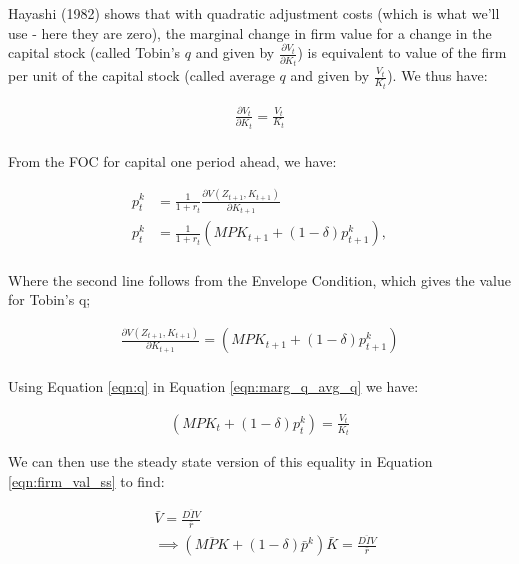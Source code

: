 \documentclass[letterpaper,12pt]{article}
\theoremstyle{definition}
\begin{document}
Hayashi (1982) shows that with quadratic adjustment costs (which is what we'll use - here they are zero), the marginal change in firm value for a change in the capital stock (called Tobin's $q$ and given by $\frac{\partial V_{t}}{\partial K_{t}}$) is equivalent to value of the firm per unit of the capital stock (called average $q$ and given by $\frac{V_{t}}{K_{t}}$).  We thus have:

\begin{equation}
\begin{split}
\label{eqn:marg_q_avg_q}
\frac{\partial V_{t}}{\partial{K_{t}}}=\frac{V_{t}}{K_{t}} \\
\end{split}
\end{equation}

From the FOC for capital one period ahead, we have:

\begin{equation}
\begin{split}
p^{k}_{t} &= \frac{1}{1+r_{t}}\frac{\partial V(Z_{t+1},K_{t+1})}{\partial K_{t+1}} \\
p^{k}_{t} &= \frac{1}{1+r_{t}}\left(MPK_{t+1} + (1-\delta)p^{k}_{t+1}\right), \\
\end{split}
\end{equation}

\noindent\noindent Where the second line follows from the Envelope Condition, which gives the value for Tobin's q; 

\begin{equation}
\label{eqn:q}
\begin{split}
\frac{\partial V(Z_{t+1},K_{t+1})}{\partial K_{t+1}} = \left(MPK_{t+1} + (1-\delta)p^{k}_{t+1}\right)\\
\end{split}
\end{equation}

Using Equation \ref{eqn:q} in Equation \ref{eqn:marg_q_avg_q} we have:

\begin{equation}
\label{eqn:q}
\begin{split}
\left(MPK_{t} + (1-\delta)p^{k}_{t}\right) = \frac{V_{t}}{K_{t}}
\end{split}
\end{equation}

We can then use the steady state version of this equality in Equation \ref{eqn:firm_val_ss} to find:

\begin{equation}
\label{eqn:firm_val_ss}
\begin{split}
& \bar{V} = \frac{\overline{DIV}}{\bar{r}} \\
& \implies \left(\overline{MPK} + (1-\delta)\bar{p}^{k}\right)\bar{K} =  \frac{\overline{DIV}}{\bar{r}} \\
\end{split}
\end{equation} 
\end{document}
